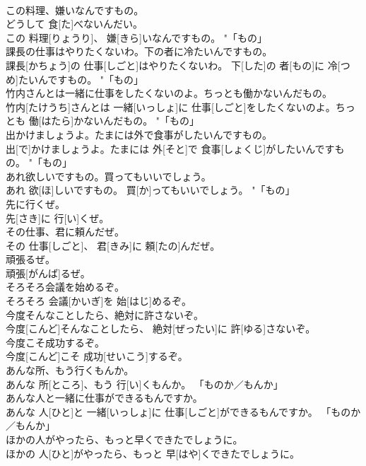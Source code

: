 \documentclass[8pt]{extreport}
\begin{document}
\begin{CJK}{UTF8}{min}
\\	この料理、嫌いなんですもの。	
\\	どうして 食[た]べないんだい。 
\\	この 料理[りょうり]、 嫌[きら]いなんですもの。	"「もの」
\\	課長の仕事はやりたくないわ。下の者に冷たいんですもの。	
\\	課長[かちょう]の 仕事[しごと]はやりたくないわ。 下[した]の 者[もの]に 冷[つめ]たいんですもの。	"「もの」
\\	竹内さんとは一緒に仕事をしたくないのよ。ちっとも働かないんだもの。	
\\	竹内[たけうち]さんとは 一緒[いっしょ]に 仕事[しごと]をしたくないのよ。ちっとも 働[はたら]かないんだもの。	"「もの」
\\	出かけましょうよ。たまには外で食事がしたいんですもの。	
\\	出[で]かけましょうよ。たまには 外[そと]で 食事[しょくじ]がしたいんですもの。	"「もの」
\\	あれ欲しいですもの。買ってもいいでしょう。	
\\	あれ 欲[ほ]しいですもの。 買[か]ってもいいでしょう。	"「もの」
\\	先に行くぜ。	
\\	先[さき]に 行[い]くぜ。	
\\	その仕事、君に頼んだぜ。	
\\	その 仕事[しごと]、 君[きみ]に 頼[たの]んだぜ。	
\\	頑張るぜ。	
\\	頑張[がんば]るぜ。	
\\	そろそろ会議を始めるぞ。	
\\	そろそろ 会議[かいぎ]を 始[はじ]めるぞ。	
\\	今度そんなことしたら、絶対に許さないぞ。	
\\	今度[こんど]そんなことしたら、 絶対[ぜったい]に 許[ゆる]さないぞ。	
\\	今度こそ成功するぞ。	
\\	今度[こんど]こそ 成功[せいこう]するぞ。	
\\	あんな所、もう行くもんか。	
\\	あんな 所[ところ]、もう 行[い]くもんか。	「ものか／もんか」
\\	あんな人と一緒に仕事ができるもんですか。	
\\	あんな 人[ひと]と 一緒[いっしょ]に 仕事[しごと]ができるもんですか。	「ものか／もんか」
\\	ほかの人がやったら、もっと早くできたでしょうに。	
\\	ほかの 人[ひと]がやったら、もっと 早[はや]くできたでしょうに。	

\end{CJK}
\end{document}
